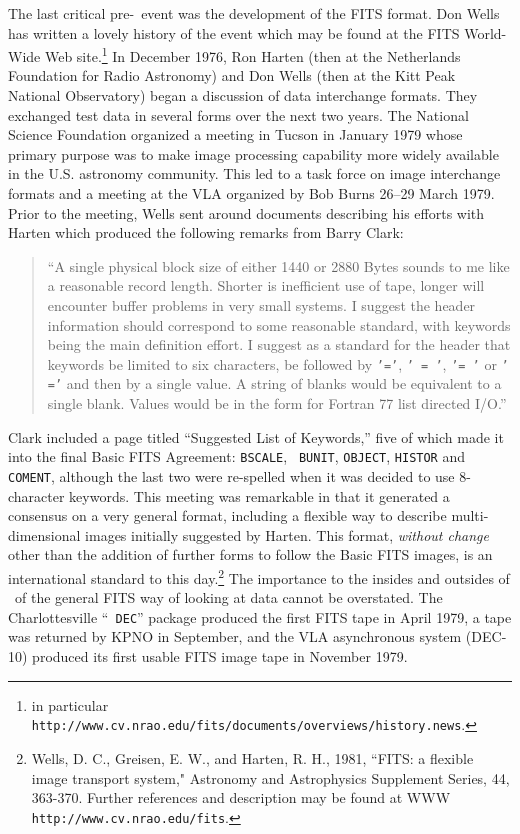 The last critical pre-\AIPS\ event was the development of the FITS
format.  Don Wells has written a lovely history of the event which may
be found at the FITS World-Wide Web site.\footnote{in particular {\tt
http://www.cv.nrao.edu/fits/documents/overviews/history.news}.}  In
December 1976, Ron Harten (then at the Netherlands Foundation for
Radio Astronomy) and Don Wells (then at the Kitt Peak National
Observatory) began a discussion of data interchange formats.  They
exchanged test data in several forms over the next two years.  The
National Science Foundation organized a meeting in Tucson in January
1979 whose primary purpose was to make image processing capability
more widely available in the U.S. astronomy community.  This led to a
task force on image interchange formats and a meeting at the VLA
organized by Bob Burns 26--29 March 1979.  Prior to the meeting, Wells
sent around documents describing his efforts with Harten which
produced the following remarks from Barry Clark:\vspace{-5pt}
\begin{quotation}
``A single physical block size of either 1440 or 2880 Bytes sounds to
me like a reasonable record length. Shorter is inefficient use of
tape, longer will encounter buffer problems in very small systems. I
suggest the header information should correspond to some reasonable
standard, with keywords being the main definition effort. I suggest as
a standard for the header that keywords be limited to six characters,
be followed by {\tt '='}, {\tt ' = '}, {\tt '= '} or {\tt ' ='} and
then by a single value.  A string of blanks would be equivalent to a
single blank. Values would be in the form for Fortran 77 list directed
I/O.''
\end{quotation}
Clark included a page titled ``Suggested List of Keywords,'' five of
which made it into the final Basic FITS Agreement: {\tt BSCALE}, {\tt
BUNIT}, {\tt OBJECT}, {\tt HISTOR} and {\tt COMENT}, although the last
two were re-spelled when it was decided to use 8-character keywords.
This meeting was remarkable in that it generated a consensus on a very
general format, including a flexible way to describe multi-dimensional
images initially suggested by Harten.  This format, {\it without
change} other than the addition of further forms to follow the Basic
FITS images, is an international standard to this day.\footnote{Wells,
D. C., Greisen, E. W., and Harten, R. H., 1981, ``FITS: a flexible
image transport system," Astronomy and Astrophysics Supplement Series,
44,  363-370.  Further references and description may be found at WWW
{\tt http://www.cv.nrao.edu/fits}.\label{fn:WGH1981}}  The importance
to the insides and outsides of \AIPS\ of the general FITS way of
looking at data cannot be overstated.  The Charlottesville ``{\tt
DEC}'' package produced the first FITS tape in April 1979, a tape was
returned by KPNO in September, and the VLA asynchronous system
(DEC-10) produced its first usable FITS image tape in November 1979.

